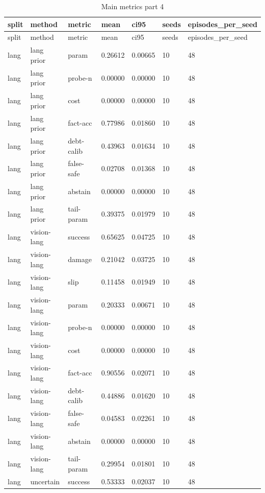 \documentclass{article}
\begin{document}
\begin{center}
\tiny
\renewcommand{\arraystretch}{0.92}
\setlength{\tabcolsep}{3pt}
\begin{longtable}{lllllll}
\caption{Main metrics part 4}\label{tab:main-metrics-4}\\
\toprule
split & method & metric & mean & ci95 & seeds & episodes\_per\_seed \\
\midrule
\endfirsthead
\toprule
split & method & metric & mean & ci95 & seeds & episodes\_per\_seed \\
\midrule
\endhead
lang & lang prior & param & 0.26612 & 0.00665 & 10 & 48 \\
lang & lang prior & probe-n & 0.00000 & 0.00000 & 10 & 48 \\
lang & lang prior & cost & 0.00000 & 0.00000 & 10 & 48 \\
lang & lang prior & fact-acc & 0.77986 & 0.01860 & 10 & 48 \\
lang & lang prior & debt-calib & 0.43963 & 0.01634 & 10 & 48 \\
lang & lang prior & false-safe & 0.02708 & 0.01368 & 10 & 48 \\
lang & lang prior & abstain & 0.00000 & 0.00000 & 10 & 48 \\
lang & lang prior & tail-param & 0.39375 & 0.01979 & 10 & 48 \\
lang & vision-lang & success & 0.65625 & 0.04725 & 10 & 48 \\
lang & vision-lang & damage & 0.21042 & 0.03725 & 10 & 48 \\
lang & vision-lang & slip & 0.11458 & 0.01949 & 10 & 48 \\
lang & vision-lang & param & 0.20333 & 0.00671 & 10 & 48 \\
lang & vision-lang & probe-n & 0.00000 & 0.00000 & 10 & 48 \\
lang & vision-lang & cost & 0.00000 & 0.00000 & 10 & 48 \\
lang & vision-lang & fact-acc & 0.90556 & 0.02071 & 10 & 48 \\
lang & vision-lang & debt-calib & 0.44886 & 0.01620 & 10 & 48 \\
lang & vision-lang & false-safe & 0.04583 & 0.02261 & 10 & 48 \\
lang & vision-lang & abstain & 0.00000 & 0.00000 & 10 & 48 \\
lang & vision-lang & tail-param & 0.29954 & 0.01801 & 10 & 48 \\
lang & uncertain & success & 0.53333 & 0.02037 & 10 & 48 \\

\end{longtable}
\end{center}
\end{document}
